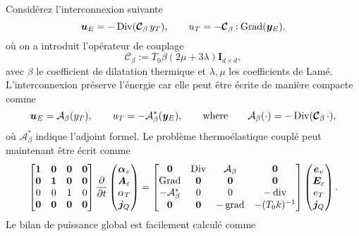 Considérez l'interconnexion suivante
\begin{equation*}
\bm{u}_E = - \Div(\bm{\mathcal{C}}_\beta \, y_T), \qquad
u_T = - \bm{\mathcal{C}}_\beta \cddot\Grad(\bm{y}_E). 
\end{equation*}
où on a introduit l'opérateur de couplage
\[\bm{\mathcal{C}}_\beta:=T_0 \beta(2\mu + 3 \lambda)\bm{I}_{d\times d}, \]
avec $\beta$ le coefficient de dilatation thermique et $\lambda, \mu$ les coefficients de Lamé. L'interconnexion préserve l'énergie car elle peut être écrite de manière compacte comme
\begin{equation*}
\bm{u}_E = \mathcal{A}_\beta(y_T), \qquad u_T = - \mathcal{A}_\beta^*(\bm{y}_E), \qquad \text{where} \qquad  \mathcal{A}_\beta(\cdot) = - \operatorname*{Div}(\bm{\mathcal{C}}_\beta \, \cdot),
\end{equation*}
où $\mathcal{A}_\beta^*$ indique l'adjoint formel. Le problème thermoélastique couplé peut maintenant être écrit comme
\begin{equation*}
\begin{bmatrix}
\bm{1} & \bm{0} & \bm{0} & \bm{0}\\
\bm{0} & \bm{1} & \bm{0} & \bm{0}\\
0 & 0 & 1 & 0\\
\bm{0} & \bm{0} & \bm{0} & \bm{0}\\
\end{bmatrix}
\diffp{}{t}
\begin{pmatrix}
\bm{\alpha}_v \\
\bm{A}_\varepsilon \\
{\alpha}_T \\
\bm{j}_Q \\
\end{pmatrix} = 
\begin{bmatrix}
\bm{0} & \Div & \mathcal{A}_\beta & \bm{0}\\
\Grad & \bm{0} & \bm{0} & \bm{0} \\
- \mathcal{A}_\beta^* & 0 & 0 & -\div \\
\bm{0} & \bm{0} & -\grad & - (T_0 k)^{-1} \\
\end{bmatrix}
\begin{pmatrix}
\bm{e}_v \\
\bm{E}_\varepsilon \\
{e}_T \\
\bm{j}_Q \\
\end{pmatrix}.
\end{equation*}
Le bilan de puissance global est facilement calculé comme
